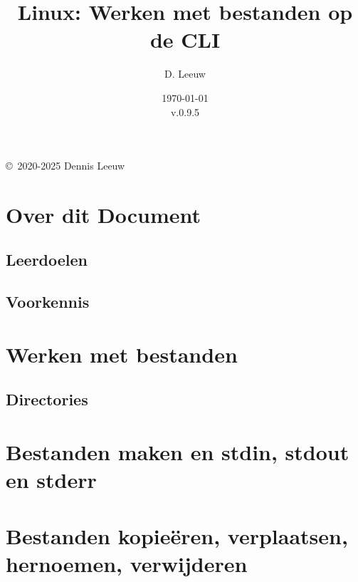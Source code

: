 \documentclass[a4paper,12pt,twoside,openright,titlepage]{book}
\author{D. Leeuw}
\title{Linux: Werken met bestanden op de CLI}
\date{\today\\v.0.9.5}
\begin{document}

\maketitle

\copyright\ 2020-2025 Dennis Leeuw\\




\frontmatter
\chapter{Over dit Document}
\section{Leerdoelen}

\section{Voorkennis}


\tableofcontents

\mainmatter

\chapter{Werken met bestanden}

\section{Directories}


\chapter{Bestanden maken en stdin, stdout en stderr}

\chapter{Bestanden kopie\"eren, verplaatsen, hernoemen, verwijderen}


\backmatter
\printindex
\end{document}
